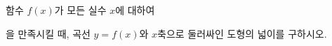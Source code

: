 함수 $f(x)$가 모든 실수 $x$에 대하여 \par\smallskip{}\par\smallskip\noindent 을 만족시킬 때, 곡선 $y=f(x)$와 $x$축으로 둘러싸인 도형의 넓이를 구하시오.

